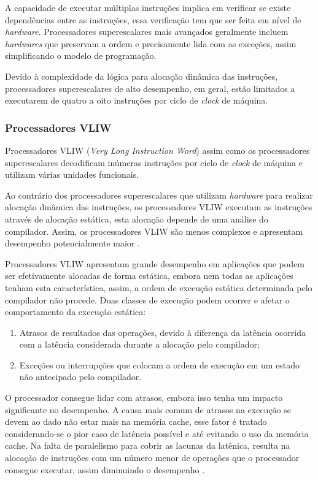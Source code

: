A capacidade de executar múltiplas instruções implica em verificar se existe
dependências entre as instruções, essa verificação tem que ser feita em nível de
\textit{hardware}. 
Processadores superescalares mais avançados geralmente incluem 
\textit{hardwares} que preservam a ordem e precisamente lida com as exceções, 
assim simplificando o modelo de programação.

Devido à complexidade da lógica para alocação dinâmica das instruções,
processadores superescalares de alto desempenho, em geral, estão limitados a
executarem de quatro a oito instruções por ciclo de \textit{clock} de máquina.


\subsubsection{Processadores VLIW}

Processadores VLIW (\textit{Very Long Instruction Word}) assim como os
processadores superescalares decodificam inúmeras instruções por ciclo de
\textit{clock} de máquina e utilizam várias unidades funcionais.

Ao contrário dos processadores superescalares que utilizam \textit{hardware}
para realizar alocação dinâmica das instruções, os processadores VLIW executam as 
instruções através de alocação estática, esta alocação depende de uma análise do
compilador.
Assim, os processadores VLIW são menos complexos e apresentam desempenho 
potencialmente maior \cite{eopc}.

Processadores VLIW apresentam grande desempenho em aplicações que podem ser 
efetivamente alocadas de forma estática, embora nem todas as aplicações
tenham esta característica, assim, a ordem de execução estática determinada pelo
compilador não procede. 
Duas classes de execução podem ocorrer e afetar o comportamento da execução 
estática:

\begin{enumerate}
        \item Atrasos de resultados das operações, devido à diferença da latência
                ocorrida com a latência considerada durante a alocação pelo
                compilador;
        \item Exceções ou interrupções que colocam a ordem de execução em um
                estado não antecipado pelo compilador.
\end{enumerate}

O processador consegue lidar com atrasos, embora isso tenha um impacto 
significante no desempenho. 
A causa mais comum de atrasos na execução se devem ao dado não estar mais na 
memória cache, esse fator é tratado considerando-se o pior caso de latência 
possível e até evitando o uso da memória cache. 
Na falta de paralelismo para cobrir as lacunas da latênica, resulta na 
alocação de instruções com um número menor de operações que o processador 
consegue executar, assim diminuindo o desempenho \cite{ocfma}.



